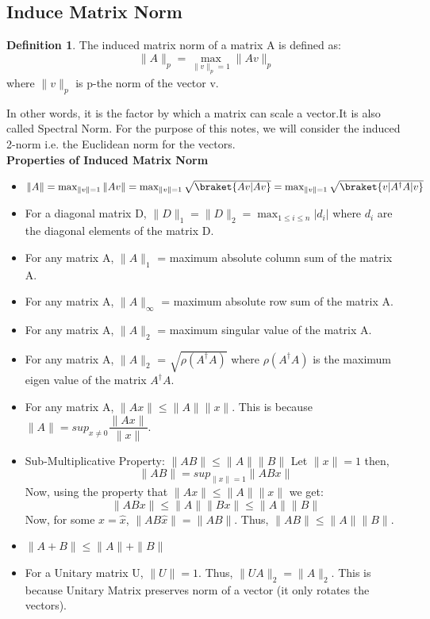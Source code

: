 \documentclass[12pt, oneside]{book}
\theoremstyle{definition}
\newtheorem{definition}{Definition}[section]
\theoremstyle{definition}
\theoremstyle{remark}
\begin{document}
\subsection{Induce Matrix Norm}
\begin{definition}
    The induced matrix norm of a matrix A is defined as:
    \[ \|A\|_p=\max_{\|v\|_p=1} \|Av\|_p \]
    where $\|v\|_p$ is p-the norm of the vector v.
\end{definition}
In other words, it is the factor by which a matrix can scale a vector.It is 
also called Spectral Norm. For the purpose of this notes, we will consider the
induced 2-norm i.e. the Euclidean norm for the vectors.\\
\textbf{Properties of Induced Matrix Norm}
\begin{itemize}
    \item $\|A\|=\max_{\|v\|=1} \|Av\|=\max_{\|v\|=1} \sqrt{\braket{Av|Av}}=\max_{\|v\|=1} \sqrt{\braket{v|A^{\dagger}A|v}}$
    \item For a diagonal matrix D, $\|D\|_1 = \|D\|_2=\max_{1\leq i \leq n} |d_i|$ where $d_i$ are the diagonal elements of the matrix D.
    \item For any matrix A, $\|A\|_1$ = maximum absolute column sum of the matrix A.
    \item For any matrix A, $\|A\|_{\infty}$ = maximum absolute row sum of the matrix A.
    \item For any matrix A, $\|A\|_2$ = maximum singular value of the matrix A.
    \item For any matrix A, $\|A\|_2$ = $\sqrt{\rho(A^{\dagger}A)}$ where $\rho(A^{\dagger}A)$ is the maximum eigen value of the matrix $A^{\dagger}A$.
    \item For any matrix A, $\|Ax\|\leq \|A\|\|x\|$. This is because $\|A\| =sup_{x\neq 0} \dfrac{\|Ax\|}{\|x\|}$.
    \item Sub-Multiplicative Property: $\|AB\|\leq \|A\|\|B\|$
    Let $\|x\|=1$ then,
    \[ \|AB\|=sup_{\|x\|=1} \|ABx\|\]
    Now, using the property that $\|Ax\|\leq \|A\|\|x\|$ we get:
    \[ \|ABx\| \leq \|A\|\|Bx\| \leq \|A\|\|B\| \]
    Now, for some $x=\hat{x}$, $\|AB\hat{x}\|=\|AB\|$.
    Thus, $\|AB\|\leq \|A\|\|B\|$.
    \item $\|A+B\|\leq \|A\|+\|B\|$
    \item For a Unitary matrix U, $\|U\|=1$. Thus, $\|UA\|_2=\|A\|_2$. This is because Unitary Matrix preserves norm of a vector (it only rotates the vectors).
\end{itemize}
\end{document}
